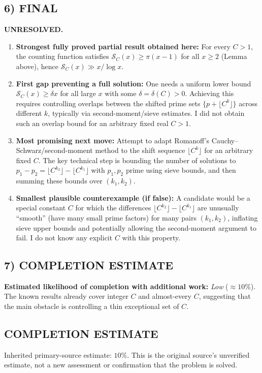 \subsection*{6) FINAL}
\textbf{UNRESOLVED.}
\begin{enumerate}[label=(\roman*),leftmargin=2.5em]
\item \textbf{Strongest fully proved partial result obtained here:} For every $C>1$, the counting function satisfies $\mathcal{S}_C(x)\ge \pi(x-1)$ for all $x\ge 2$ (Lemma above), hence $\mathcal{S}_C(x)\gg x/\log x$.
\item \textbf{First gap preventing a full solution:} One needs a uniform lower bound $\mathcal{S}_C(x)\ge \delta x$ for all large $x$ with some $\delta=\delta(C)>0$. Achieving this requires controlling overlaps between the shifted prime sets $\{p+\lfloor C^k\rfloor\}$ across different $k$, typically via second-moment/sieve estimates. I did not obtain such an overlap bound for an arbitrary fixed real $C>1$.
\item \textbf{Most promising next move:} Attempt to adapt Romanoff's Cauchy--Schwarz/second-moment method to the shift sequence $\lfloor C^k\rfloor$ for an arbitrary fixed $C$. The key technical step is bounding the number of solutions to $p_1-p_2=\lfloor C^{k_2}\rfloor-\lfloor C^{k_1}\rfloor$ with $p_1,p_2$ prime using sieve bounds, and then summing these bounds over $(k_1,k_2)$.
\item \textbf{Smallest plausible counterexample (if false):} A candidate would be a special constant $C$ for which the differences $\lfloor C^{k_2}\rfloor-\lfloor C^{k_1}\rfloor$ are unusually ``smooth'' (have many small prime factors) for many pairs $(k_1,k_2)$, inflating sieve upper bounds and potentially allowing the second-moment argument to fail. I do not know any explicit $C$ with this property.
\end{enumerate}

\subsection*{7) COMPLETION ESTIMATE}
\textbf{Estimated likelihood of completion with additional work:} \emph{Low} (\(\approx 10\%\)). The known results already cover integer $C$ and almost-every $C$, suggesting that the main obstacle is controlling a thin exceptional set of $C$.




\subsection*{COMPLETION ESTIMATE}
Inherited primary-source estimate: $10\%$. This is the original source's unverified estimate, not a new assessment or confirmation that the problem is solved.
